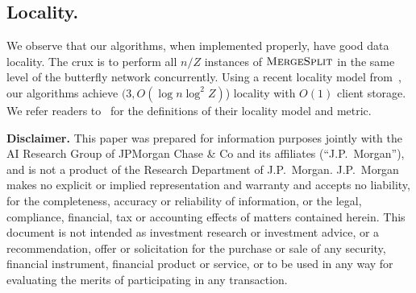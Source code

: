 \subsection{Locality.}
We observe that our algorithms, when implemented properly, have good data locality.
The crux is to perform all $n/Z$ instances of 
$\textsc{MergeSplit}$ in the same level of the butterfly network concurrently.
Using a recent locality model from~\cite{asharov2019locality},
our algorithms achieve $(3, O(\log n \log^2 Z)$) locality with $O(1)$ client storage.
We refer readers to~\cite{asharov2019locality} for the definitions of their locality model and metric.



\medskip
{\small
\noindent
{\bf Disclaimer.}
This paper was prepared for information purposes jointly with the AI Research Group of JPMorgan Chase \& Co and its affiliates (“J.P.~Morgan”), and is not a product of the Research Department of J.P.~Morgan. J.P.~Morgan makes no explicit or implied representation and warranty and accepts no liability, for the completeness, accuracy or reliability of information, or the legal, compliance, financial, tax or accounting effects of matters contained herein. This document is not intended as investment research or investment advice, or a recommendation, offer or solicitation for the purchase or sale of any security, financial instrument, financial product or service, or to be used in any way for evaluating the merits of participating in any transaction.
}
